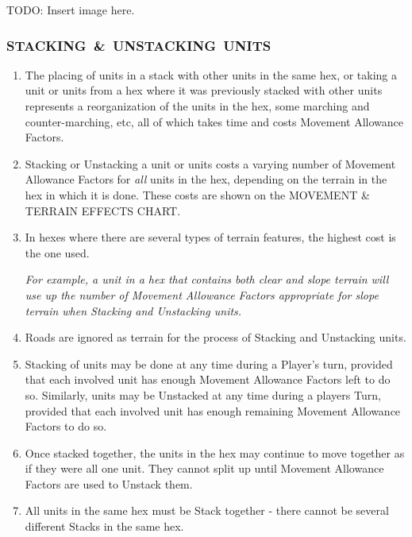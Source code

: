 TODO: Insert image here.

\subsubsection[STACKING \& UNSTACKING UNITS]{\mbox{STACKING \& UNSTACKING UNITS}}

\begin{enumerate}
  \item The placing of units in a stack with other units in the same hex, or taking a unit or units from a hex where it was previously stacked with other units represents a reorganization of the units in the hex, some marching and counter-marching, etc, all of which takes time and costs Movement Allowance Factors.

  \item Stacking or Unstacking a unit or units costs a varying number of Movement Allowance Factors for \textit{all} units in the hex, depending on the terrain in the hex in which it is done. These costs are shown on the MOVEMENT \& TERRAIN EFFECTS CHART.

  \item In hexes where there are several types of terrain features, the highest cost is the one used.

  \textit{For example, a unit in a hex that contains both clear and slope terrain will use up the number of Movement Allowance Factors appropriate for slope terrain when Stacking and Unstacking units.}

  \item Roads are ignored as terrain for the process of Stacking and Unstacking units.

  \item Stacking of units may be done at any time during a Player's turn, provided that each involved unit has enough Movement Allowance Factors left to do so. Similarly, units may be Unstacked at any time during a players Turn, provided that each involved unit has enough remaining Movement Allowance Factors to do so.

  \item Once stacked together, the units in the hex may continue to move together as if they were all one unit. They cannot split up until Movement Allowance Factors are used to Unstack them.

  \item All units in the same hex must be Stack together - there cannot be several different Stacks in the same hex.
\end{enumerate}

